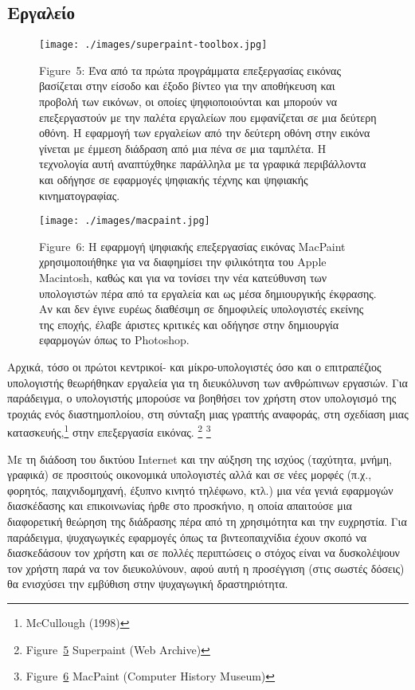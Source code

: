 \documentclass[
]{article}
\begin{document}
\hypertarget{ux3b5ux3c1ux3b3ux3b1ux3bbux3b5ux3afux3bf}{%
\subsection{Εργαλείο}\label{ux3b5ux3c1ux3b3ux3b1ux3bbux3b5ux3afux3bf}}

\leavevmode{}%
\begin{figure}
\hypertarget{fig:superpaint-toolbox}{%
\centering
\texttt{[image: ./images/superpaint-toolbox.jpg]}
\caption{Figure~5: Ένα από τα πρώτα προγράμματα επεξεργασίας εικόνας
βασίζεται στην είσοδο και έξοδο βίντεο για την αποθήκευση και προβολή
των εικόνων, οι οποίες ψηφιοποιούνται και μπορούν να επεξεργαστούν με
την παλέτα εργαλείων που εμφανίζεται σε μια δεύτερη οθόνη. Η εφαρμογή
των εργαλείων από την δεύτερη οθόνη στην εικόνα γίνεται με έμμεση
διάδραση από μια πένα σε μια ταμπλέτα. Η τεχνολογία αυτή αναπτύχθηκε
παράλληλα με τα γραφικά περιβάλλοντα και οδήγησε σε εφαρμογές ψηφιακής
τέχνης και ψηφιακής κινηματογραφίας.}\label{fig:superpaint-toolbox}
}
\end{figure}

\leavevmode{}%
\begin{figure}
\hypertarget{fig:macpaint}{%
\centering
\texttt{[image: ./images/macpaint.jpg]}
\caption{Figure~6: Η εφαρμογή ψηφιακής επεξεργασίας εικόνας MacPaint
χρησιμοποιήθηκε για να διαφημίσει την φιλικότητα του Apple Macintosh,
καθώς και για να τονίσει την νέα κατεύθυνση των υπολογιστών πέρα από τα
εργαλεία και ως μέσα δημιουργικής έκφρασης. Αν και δεν έγινε ευρέως
διαθέσιμη σε δημοφιλείς υπολογιστές εκείνης της εποχής, έλαβε άριστες
κριτικές και οδήγησε στην δημιουργία εφαρμογών όπως το
Photoshop.}\label{fig:macpaint}
}
\end{figure}

Αρχικά, τόσο οι πρώτοι κεντρικοί- και μίκρο-υπολογιστές όσο και ο
επιτραπέζιος υπολογιστής θεωρήθηκαν εργαλεία για τη διευκόλυνση των
ανθρώπινων εργασιών. Για παράδειγμα, ο υπολογιστής μπορούσε να βοηθήσει
τον χρήστη στον υπολογισμό της τροχιάς ενός διαστημοπλοίου, στη σύνταξη
μιας γραπτής αναφοράς, στη σχεδίαση μιας κατασκευής,\footnote{McCullough
  (1998)} στην επεξεργασία εικόνας. \footnote{Figure~\protect\hyperlink{fig:superpaint-toolbox}{5}
  Superpaint (Web Archive)} \footnote{Figure~\protect\hyperlink{fig:macpaint}{6}
  MacPaint (Computer History Museum)}

Με τη διάδοση του δικτύου Internet και την αύξηση της ισχύος (ταχύτητα,
μνήμη, γραφικά) σε προσιτούς οικονομικά υπολογιστές αλλά και σε νέες
μορφές (π.χ., φορητός, παιχνιδομηχανή, έξυπνο κινητό τηλέφωνο, κτλ.) μια
νέα γενιά εφαρμογών διασκέδασης και επικοινωνίας ήρθε στο προσκήνιο, η
οποία απαιτούσε μια διαφορετική θεώρηση της διάδρασης πέρα από τη
χρησιμότητα και την ευχρηστία. Για παράδειγμα, ψυχαγωγικές εφαρμογές
όπως τα βιντεοπαιχνίδια έχουν σκοπό να διασκεδάσουν τον χρήστη και σε
πολλές περιπτώσεις ο στόχος είναι να δυσκολέψουν τον χρήστη παρά να τον
διευκολύνουν, αφού αυτή η προσέγγιση (στις σωστές δόσεις) θα ενισχύσει
την εμβύθιση στην ψυχαγωγική δραστηριότητα.
\end{document}
